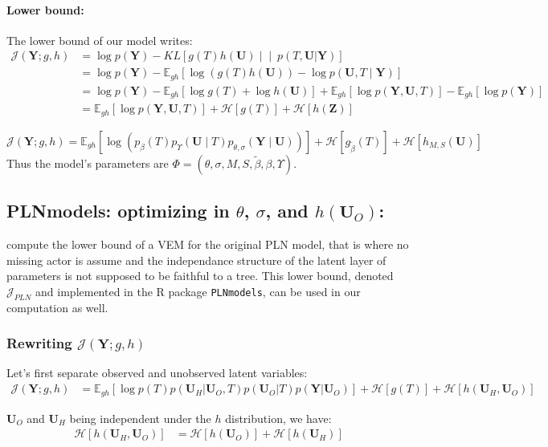 \documentclass[11pt,a4paper]{article}
\newcommand{\entr}{\mathcal{H}}
\newcommand{\Ybf}{\boldsymbol{Y}}
\newcommand{\Zbf}{\boldsymbol{Z}}
\newcommand{\Ubf}{\boldsymbol{U}}
\newcommand{\Esp}{\mathds{E}}
\begin{document}
\paragraph{Lower bound:}
The lower bound of our model writes:
\begin{align*}
\mathcal{J}(\Ybf; g,h)&=\log p(\Ybf) - KL\left[g(T) h(\Ubf) \middle\vert\middle\vert\ p(T,\Ubf | \Ybf)\right]\\
&= \log p(\Ybf) - \Esp_{gh}[\log( g(T) h(\Ubf)) - \log p(\Ubf,T\mid \Ybf) ]\\
&= \log p(\Ybf) - \Esp_{gh}[\log g(T) + \log h(\Ubf) ] + \Esp_{gh}[\log p(\Ybf,\Ubf,T)] - \Esp_{gh}[\log p(\Ybf)]\\
&= \Esp_{gh} [\log p(\Ybf,\Ubf,T)] + \entr[g(T)] + \entr[h(\Zbf)]
\end{align*}

\begin{equation}
\label{firstJ}
 \boxed{\mathcal{J}(\Ybf; g,h) = \Esp_{gh} [\log (p_\beta(T)p_{\Upsilon}(\Ubf\mid T)p_{\theta, \sigma}(\Ybf\mid \Ubf))] + \entr[g_{\widetilde{\beta}}(T)] + \entr[h_{M,S}(\Ubf)]}
\end{equation}
Thus the model's parameters are $\Phi = (\theta,\sigma,M,S,\widetilde{\beta}, \beta,  \Upsilon)$.

\subsection{PLNmodels: optimizing in $\theta$, $\sigma$, and $h(\Ubf_O)$:}
\citet{CMR18} compute the lower bound of a VEM for the original PLN model, that is where no missing actor is assume and the independance structure of the latent layer of parameters is not supposed to be faithful to a tree. This lower bound, denoted $\mathcal{J}_{PLN}$  and implemented  in the R package \texttt{PLNmodels}, can be used in our computation as well.

\subsubsection{Rewriting  $\mathcal{J}(\Ybf; g,h)$}
Let's first separate observed and unobserved latent variables:
\begin{align*}
\mathcal{J}(\Ybf; g,h)&= \Esp_{gh}[\log p(T)  p(\Ubf_H| \Ubf_O,T) p(\Ubf_O|T)p(\Ybf|\Ubf_O)] + \entr[g(T)] +\entr[h(\Ubf_H,\Ubf_O)]
\end{align*}

 $\Ubf_O$ and $\Ubf_H$ being independent under the $h$ distribution, we have:
\begin{align*}
\entr[h(\Ubf_H,\Ubf_O)] &=\entr[h(\Ubf_O)] +\entr[h(\Ubf_H)]
\end{align*}
\end{document}
